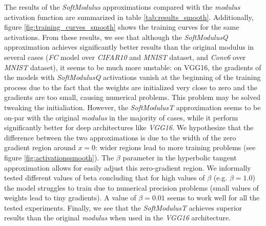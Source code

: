 \documentclass[authoryear]{elsarticle}
\begin{document}
The results of the \textit{SoftModulus} approximations compared with the \textit{modulus} activation function are summarized in table \ref{tab:results_smooth}. Additionally, figure \ref{fig:training_curves_smooth} shows the training curves for the same activations. From these results, we see that although the \textit{SoftModulusQ} approximation achieves significantly better results than the original modulus in several cases (\textit{FC} model over \textit{CIFAR10} and \textit{MNIST} dataset, and \textit{Conv6} over \textit{MNIST} dataset), it seems to be much more unstable: on VGG16, the gradients of the models with \textit{SoftModulusQ} activations vanish at the beginning of the training process due to the fact that the weights are initialized very close to zero and the gradients are too small, causing numerical problems. This problem may be solved tweaking the initialiation. However, the \textit{SoftModulusT} approximation seems to be on-par with the original \textit{modulus} in the majority of cases, while it perform significantly better for deep architectures like \textit{VGG16}. We hypothesize that the difference between the two approximations is due to the width of the zero gradient region around $x=0$: wider regions lead to more training problems (see figure \ref{fig:activationssmooth}). The $\beta$ parameter in the hyperbolic tangent approximation allows for easily adjust this zero-gradient region. We informally tested different values of beta concluding that for high values of $\beta$ (e.g. $\beta=1.0$) the model struggles to train due to numerical precision problems (small values of weights lead to tiny gradients). A value of $\beta=0.01$ seems to work well for all the tested experiments. Finally, we see that the \textit{SoftModulusT} achieves superior results than the original \textit{modulus} when used in the \textit{VGG16} architecture.
\end{document}
